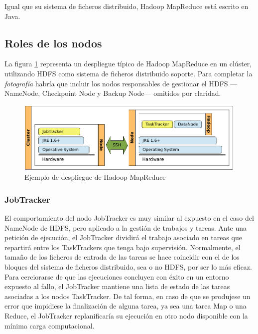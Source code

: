 Igual que su sistema de ficheros distribuido, Hadoop MapReduce est\'a escrito en Java.


\subsection{Roles de los nodos}\label{subsec:rolesnodosmapred}
\noindent La figura \ref{fig:desplieguehadoopmapred} representa un despliegue t\'ipico de Hadoop MapReduce en un cl\'uster, utilizando HDFS como sistema de ficheros distribuido soporte. Para completar la \emph{fotograf\'ia} habr\'ia que incluir los nodos responsables de gestionar el HDFS ---NameNode, Checkpoint Node y Backup Node--- omitidos por claridad.

\begin{figure}[tbp]
\begin{center}
\includegraphics[width=0.99\textwidth]{imagenes/020.pdf}
 \caption{Ejemplo de despliegue de Hadoop MapReduce}
\label{fig:desplieguehadoopmapred}
\end{center}
\end{figure}

\subsubsection{JobTracker}\label{subsubsec:jobtracker}
\noindent El comportamiento del nodo JobTracker es muy similar al expuesto en el caso del NameNode de HDFS, pero aplicado a la gesti\'on de trabajos y tareas. Ante una petici\'on de ejecuci\'on, el JobTracker dividir\'a el trabajo asociado en tareas que repartir\'a entre los TaskTrackers que tenga bajo supervisi\'on. Normalmente, el tama\~no de los ficheros de entrada de las tareas se hace coincidir con el de los bloques del sistema de ficheros distribuido, sea o no HDFS, por ser lo m\'as eficaz. Para cerciorarse de que las ejecuciones concluyen con \'exito en un entorno expuesto al fallo, el JobTracker mantiene una lista de estado de las tareas asociadas a los nodos TaskTracker. De tal forma, en caso de que se produjese un error que impidiese la finalizaci\'on de alguna tarea, ya sea una tarea Map o una Reduce, el JobTracker replanificar\'ia su ejecuci\'on en otro nodo disponible con la m\'inima carga computacional.\newline

